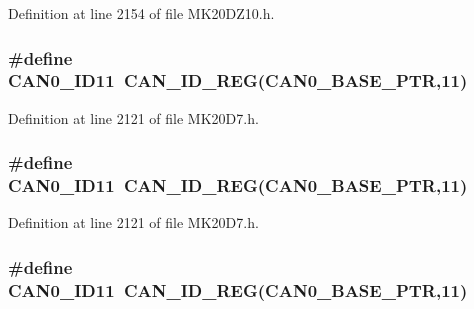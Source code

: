 Definition at line 2154 of file M\+K20\+D\+Z10.\+h.

\subsubsection[{\texorpdfstring{C\+A\+N0\+\_\+\+I\+D11}{CAN0_ID11}}]{\setlength{\rightskip}{0pt plus 5cm}\#define C\+A\+N0\+\_\+\+I\+D11~{\bf C\+A\+N\+\_\+\+I\+D\+\_\+\+R\+EG}({\bf C\+A\+N0\+\_\+\+B\+A\+S\+E\+\_\+\+P\+TR},11)}\hypertarget{group___c_a_n___register___accessor___macros_gac7ce9f16e49190ac07de37d16810df2d}{}\label{group___c_a_n___register___accessor___macros_gac7ce9f16e49190ac07de37d16810df2d}


Definition at line 2121 of file M\+K20\+D7.\+h.

\subsubsection[{\texorpdfstring{C\+A\+N0\+\_\+\+I\+D11}{CAN0_ID11}}]{\setlength{\rightskip}{0pt plus 5cm}\#define C\+A\+N0\+\_\+\+I\+D11~{\bf C\+A\+N\+\_\+\+I\+D\+\_\+\+R\+EG}({\bf C\+A\+N0\+\_\+\+B\+A\+S\+E\+\_\+\+P\+TR},11)}\hypertarget{group___c_a_n___register___accessor___macros_gac7ce9f16e49190ac07de37d16810df2d}{}\label{group___c_a_n___register___accessor___macros_gac7ce9f16e49190ac07de37d16810df2d}


Definition at line 2121 of file M\+K20\+D7.\+h.

\subsubsection[{\texorpdfstring{C\+A\+N0\+\_\+\+I\+D11}{CAN0_ID11}}]{\setlength{\rightskip}{0pt plus 5cm}\#define C\+A\+N0\+\_\+\+I\+D11~{\bf C\+A\+N\+\_\+\+I\+D\+\_\+\+R\+EG}({\bf C\+A\+N0\+\_\+\+B\+A\+S\+E\+\_\+\+P\+TR},11)}\hypertarget{group___c_a_n___register___accessor___macros_gac7ce9f16e49190ac07de37d16810df2d}{}\label{group___c_a_n___register___accessor___macros_gac7ce9f16e49190ac07de37d16810df2d}


